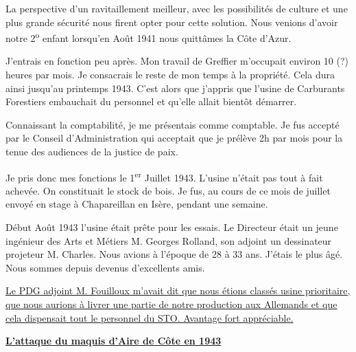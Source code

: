 
La perspective d’un ravitaillement meilleur, avec les possibilités de culture et une plus grande
sécurité nous firent opter pour cette solution. Nous venions d’avoir notre 2\textsuperscript{o}
enfant lorsqu’en Août 1941 nous quittâmes la Côte d’Azur.

\vspace{0.45cm}

J’entrais en fonction peu après. Mon travail de Greffier m’occupait environ 10 (?) heures par
mois. Je consacrais le reste de mon temps à la propriété. Cela dura ainsi jusqu’au printemps
1943. C’est alors que j’appris que l’usine de Carburants Forestiers embauchait du personnel
et qu’elle allait bientôt démarrer.

\vspace{0.45cm}

Connaissant la comptabilité, je me présentais comme comptable. Je fus accepté par le Conseil
d’Administration qui acceptait que je prélève 2h par mois pour la tenue des audiences de la
justice de paix.

\vspace{0.45cm}

Je pris donc mes fonctions le 1\textsuperscript{er} Juillet 1943. L’usine n’était pas tout à fait achevée. On
constituait le stock de bois. Je fus, au cours de ce mois de juillet envoyé en stage à
Chapareillan en Isère, pendant une semaine.

\vspace{0.45cm}

Début Août 1943 l’usine était prête pour les essais. Le Directeur était un jeune ingénieur des
Arts et Métiers M. Georges Rolland, son adjoint un dessinateur projeteur M. Charles. Nous
avions à l’époque de 28 à 33 ans. J’étais le plus âgé. Nous sommes depuis devenus
d’excellents amis.

\vspace{0.45cm}

\underline{Le PDG adjoint M. Fouilloux m’avait dit que nous étions classés usine prioritaire, que nous aurions à livrer une partie de notre production aux Allemands et que cela dispensait tout le personnel du STO. Avantage fort appréciable.}

\vspace{0.55cm}

\underline{\textbf{L’attaque du maquis d’Aire de Côte en 1943}}

